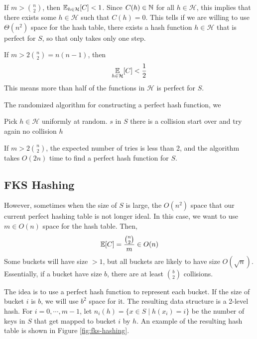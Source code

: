 If $m > {n \choose 2}$, then $\operatorname*{\mathbb{E}}_{h \in \mathcal{H}}[C] < 1$. Since $C(h) \in \mathbb{N}$ for all $h \in \mathcal{H}$, this implies that there exists some $h \in \mathcal{H}$ such that $C(h) = 0$. This tells if we are willing to use $\Theta(n^2)$ space for the hash table, there exists a hash function $h \in \mathcal{H}$ that is perfect for $S$, so that  only takes only one step.

\begin{theorem}
    If $m > 2 {n \choose 2} = n(n-1)$, then
    $$
    \operatorname*{\mathbb{E}}_{h \in \mathcal{H}}[C] < \frac{1}{2}
    $$
    This means more than half of the functions in $\mathcal{H}$ is perfect for $S$.
\end{theorem}

The randomized algorithm for constructing a perfect hash function, we

\begin{codebox}
    \li Pick $h \in \mathcal{H}$ uniformly at random.
    \li \For $s$ in $S$ \Do
        \li \If there is a collision \Then
        \li start over and try again
    \End \End
    \li \If no collision \Then
        \li \Return $h$ 
\end{codebox}

If $m > 2 {n \choose 2}$, the expected number of tries is less than 2, and the algorithm takes $O(2n)$ time to find a perfect hash function for $S$.

\subsection{FKS Hashing} 

However, sometimes when the size of $S$ is large, the $O(n^2)$ space that our current perfect hashing table is not longer ideal. In this case, we want to use $m \in O(n)$ space for the hash table. Then,
$$
\operatorname*{\mathbb{E}}[C] = \frac{{n \choose 2}}{m} \in O(n)
$$
Some buckets will have size $>1$, but all buckets are likely to have size $O(\sqrt{n})$. Essentially, if a bucket have size $b$, there are at least $\displaystyle {b \choose 2}$ collisions. 

The idea is to use a perfect hash function to represent each bucket. If the size of bucket $i$ is $b$, we will use $b^2$ space for it. The resulting data structure is a 2-level hash. For $i=0,\cdots,m-1$, let $n_i(h) = \{ x \in S \mid h(x_i) = i \}$ be the number of keys in $S$ that get mapped to bucket $i$ by $h$. An example of the resulting hash table is shown in Figure \ref{fig:fks-hashing}.

